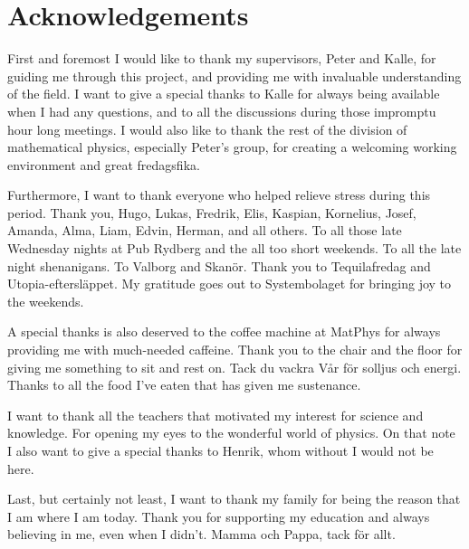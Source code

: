 \section*{Acknowledgements}
First and foremost I would like to thank my supervisors, Peter and Kalle, for guiding me through this project, and providing me with invaluable understanding of the field. I want to give a special thanks to Kalle for always being available when I had any questions, and to all the discussions during those impromptu hour long meetings. I would also like to thank the rest of the division of mathematical physics, especially Peter's group, for creating a welcoming working environment and great fredagsfika.

Furthermore, I want to thank everyone who helped relieve stress during this period. Thank you, Hugo, Lukas, Fredrik, Elis, Kaspian, Kornelius, Josef, Amanda, Alma, Liam, Edvin, Herman, and all others. To all those late Wednesday nights at Pub Rydberg and the all too short weekends. To all the late night shenanigans. To Valborg and Skanör. Thank you to Tequilafredag and Utopia-eftersläppet. My gratitude goes out to Systembolaget for bringing joy to the weekends.

A special thanks is also deserved to the coffee machine at MatPhys for always providing me with much-needed caffeine. Thank you to the chair and the floor for giving me something to sit and rest on. Tack du vackra Vår för solljus och energi. Thanks to all the food I've eaten that has given me sustenance.

I want to thank all the teachers that motivated my interest for science and knowledge. For opening my eyes to the wonderful world of physics. On that note I also want to give a special thanks to Henrik, whom without I would not be here. 

Last, but certainly not least, I want to thank my family for being the reason that I am where I am today. Thank you for supporting my education and always believing in me, even when I didn't. Mamma och Pappa, tack för allt.